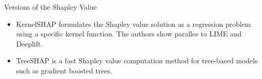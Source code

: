 \documentclass[aspectratio=169]{../latex_main/tntbeamer}  %
\begin{document}
\begin{frame}{Versions of the Shapley Value  }

  \begin{itemize}
  \item KernelSHAP formulates the Shapley value solution as a regression problem using a specific kernel function. The authors show paralles to LIME and Deeplift.
  \item TreeSHAP is a fast Shapley value computation method for tree-based models such as gradient boosted trees.
 \end{itemize}
\end{frame}
\end{document}
